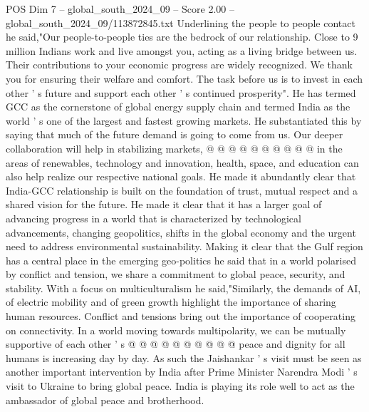 \begin{textsample}{POS Dim 7 – global\_south\_2024\_09 – Score 2.00 – global\_south\_2024\_09/113872845.txt}
Underlining the people to people contact he said,"Our people-to-people ties are the bedrock of our relationship.
Close to 9 million Indians work and live amongst you, acting as a living bridge between us.
Their contributions to your economic progress are widely recognized.
We thank you for ensuring their welfare and comfort.
The task before us is to invest in each other ' s future and support each other ' s continued prosperity".
He has termed GCC as the cornerstone of global energy supply chain and termed India as the world ' s one of the largest and fastest growing markets.
He substantiated this by saying that much of the future demand is going to come from us.
Our deeper collaboration will help in stabilizing markets, @ @ @ @ @ @ @ @ @ @ in the areas of renewables, technology and innovation, health, space, and education can also help realize our respective national goals.
He made it abundantly clear that India-GCC relationship is built on the foundation of trust, mutual respect and a shared vision for the future.
He made it clear that it has a larger goal of advancing progress in a world that is characterized by technological advancements, changing geopolitics, shifts in the global economy and the urgent need to address environmental sustainability.
Making it clear that the Gulf region has a central place in the emerging geo-politics he said that in a world polarised by conflict and tension, we share a commitment to global peace, security, and stability.
With a focus on multiculturalism he said,"Similarly, the demands of AI, of electric mobility and of green growth highlight the importance of sharing human resources.
Conflict and tensions bring out the importance of cooperating on connectivity.
In a world moving towards multipolarity, we can be mutually supportive of each other ' s @ @ @ @ @ @ @ @ @ @ peace and dignity for all humans is increasing day by day.
As such the Jaishankar ' s visit must be seen as another important intervention by India after Prime Minister Narendra Modi ' s visit to Ukraine to bring global peace.
India is playing its role well to act as the ambassador of global peace and brotherhood.

\end{textsample}
